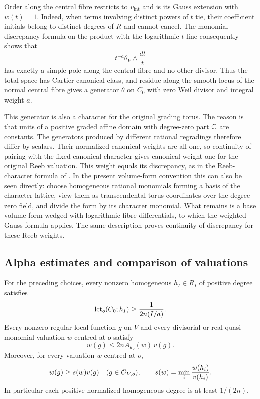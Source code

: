 Order along the central fibre restricts to $v_{\mathrm{int}}$ and is
its Gauss extension with $w(t)=1$.  Indeed, when terms involving distinct
powers of $t$ tie, their coefficient initials belong to distinct degrees
of $R$ and cannot cancel.  The monomial discrepancy formula on the
product with the logarithmic $t$-line consequently shows that
\begin{equation}\label{cone:rees-form}
 t^{-a}\theta_V\wedge\frac{dt}{t}
\end{equation}
has exactly a simple pole along the central fibre and no other divisor.
Thus the total space has Cartier canonical class, and residue along the
smooth locus of the normal central fibre gives a generator $\theta$ on
$C_0$ with zero Weil divisor and integral weight $a$.

This generator is also a character for the original grading torus.
The reason is that units of a positive graded affine domain with
degree-zero part $\mathbb C$ are constants.  The generators produced by
different rational regradings therefore differ by scalars.  Their
normalized canonical weights are all one, so continuity of pairing
with the fixed canonical character gives canonical weight one for the
original Reeb valuation.  This weight equals its discrepancy, as in the Reeb-character formula
of \cite[Lemma~2.18 and Definition~2.20]{LiXuHigherRank}. In the present
volume-form convention this can also be seen directly: choose
homogeneous rational monomials forming a basis of the character lattice,
view them as transcendental torus coordinates over the degree-zero
field, and divide the form by its character monomial.  What remains is
a base volume form wedged with logarithmic fibre differentials, to
which the weighted Gauss formula applies.  The same description proves
continuity of discrepancy for these Reeb weights.

\subsection{Alpha estimates and comparison of valuations}

\begin{proposition}\label{prop:cone-estimates}
For the preceding choices, every nonzero homogeneous $h_I\in R_I$ of
positive degree satisfies
\begin{equation}\label{cone:alpha}
 \operatorname{lct}_o(C_0;h_I)\geq\frac{1}{2n(I/a)}.
\end{equation}
Every nonzero regular local function $g$ on $V$ and every divisorial or
real quasi-monomial valuation $w$ centred at $o$ satisfy
\begin{equation}\label{cone:alpha-germ}
 w(g)\leq 2n A_{\theta_V}(w)\,v(g).
\end{equation}
Moreover, for every valuation $w$ centred at $o$,
\begin{equation}\label{cone:comparison}
 w(g)\geq s(w)v(g)\quad(g\in\mathcal O_{V,o}),
 \qquad s(w)=\min_i\frac{w(h_i)}{v(h_i)}.
\end{equation}
In particular each positive normalized homogeneous degree is at least
$1/(2n)$.
\end{proposition}

